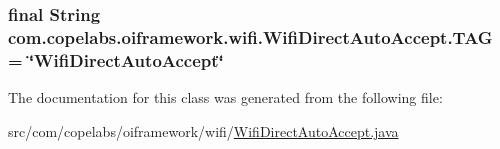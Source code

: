 \subsubsection[{T\+A\+G}]{\setlength{\rightskip}{0pt plus 5cm}final String com.\+copelabs.\+oiframework.\+wifi.\+Wifi\+Direct\+Auto\+Accept.\+T\+A\+G = \char`\"{}Wifi\+Direct\+Auto\+Accept\char`\"{}\hspace{0.3cm}{\ttfamily [static]}}\label{classcom_1_1copelabs_1_1oiframework_1_1wifi_1_1_wifi_direct_auto_accept_a846a900891cb89f8bf349d8a72fab581}


The documentation for this class was generated from the following file\+:\begin{DoxyCompactItemize}
\item 
src/com/copelabs/oiframework/wifi/\hyperlink{_wifi_direct_auto_accept_8java}{Wifi\+Direct\+Auto\+Accept.\+java}\end{DoxyCompactItemize}

